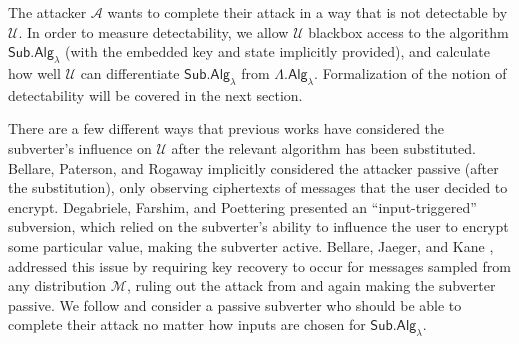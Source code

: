 The attacker $\mathcal{A}$ wants to complete their attack in a way that is not detectable by $\mathcal{U}$. In order to measure detectability, we allow $\mathcal{U}$ blackbox access to the algorithm $\mathsf{Sub.Alg}_\lambda$ (with the embedded key and state implicitly provided), and calculate how well $\mathcal{U}$ can differentiate $\mathsf{Sub.Alg}_\lambda$ from $\mathsf{\Lambda.Alg}_\lambda$. Formalization of the notion of detectability will be covered in the next section.

There are a few different ways that previous works have considered the subverter's influence on $\mathcal{U}$ after the relevant algorithm has been substituted. Bellare, Paterson, and Rogaway \cite{C:BelPatRog14} implicitly considered the attacker passive (after the substitution), only observing ciphertexts of messages that the user decided to encrypt. Degabriele, Farshim, and Poettering \cite{FSE:DegFarPoe15} presented an ``input-triggered'' subversion, which relied on the subverter's ability to influence the user to encrypt some particular value, making the subverter active. Bellare, Jaeger, and Kane \cite{CCS:BelJaeKan15}, addressed this issue by requiring key recovery to occur for messages sampled from any distribution $\mathcal{M}$, ruling out the attack from \cite{FSE:DegFarPoe15} and again making the subverter passive. We follow \cite{CCS:BelJaeKan15} and consider a passive subverter who should be able to complete their attack no matter how inputs are chosen for $\mathsf{Sub.Alg}_\lambda$.

